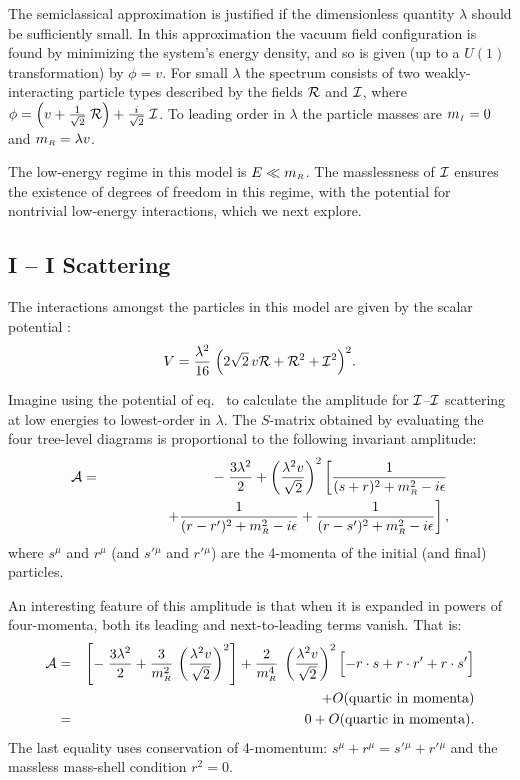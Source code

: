 The semiclassical approximation is justified if the dimensionless 
quantity $\lambda$ should be sufficiently small. In this approximation
the vacuum field configuration is found by minimizing the system's 
energy density, and so is given (up to a $U(1)$ transformation)
by $\phi = v$. 
For small $\lambda$ the spectrum consists of two weakly-interacting
particle types described by the fields ${\cal R}$ and ${\cal I}$,
where $\phi = \left( v + \frac{1}{\sqrt2} \; {\cal R} \right) + 
\frac{i}{\sqrt2} \; {\cal I}$. To leading order in $\lambda$
the particle masses are $m_{\scriptscriptstyle I} = 0$ and $m_{\scriptscriptstyle R} 
= \lambda v$. 

The low-energy regime in this model is $E \ll m_{\scriptscriptstyle R}$. The
masslessness of ${\cal I}$ ensures the existence of degrees of
freedom in this regime, with the potential for nontrivial
low-energy interactions, which we next explore. 

\subsection{{\cal I} -- {\cal I} Scattering}

The interactions amongst the particles in this model 
are given by the scalar potential :
%
\begin{equation}
\label{potl}
V = {\lambda^2 \over 16} \; \Bigl( 2 \sqrt2 \, v {\cal R} +
{\cal R}^2 + {\cal I}^2 \Bigr)^2. 
\end{equation}

Imagine using the potential of eq.~ to 
calculate the amplitude for
${\cal I}$--${\cal I}$ scattering at low energies 
to lowest-order in $\lambda$. 
The $S$-matrix obtained by evaluating the four tree-level diagrams
is proportional to the following invariant amplitude:
%
\begin{eqnarray}
\label{smatrixresult}
{\cal A} &=& - \; {3 \lambda^2 \over 2} + \left( { \lambda^2 v \over \sqrt2}
\right)^2 \left[ {1 \over (s+r)^2 + m_{\scriptscriptstyle R}^2 - i\epsilon}  \right. \nonumber\\
&& \qquad\qquad \left. + {1 \over (r-r')^2 + m_{\scriptscriptstyle R}^2 -i \epsilon} + 
{1 \over (r - s')^2 + m_{\scriptscriptstyle R}^2 - i\epsilon}\right], 
\end{eqnarray}
%
where $s^\mu$ and $r^\mu$ (and $s'{}^\mu$ and $r'{}^\mu$)
are the 4-momenta of the initial (and final) particles.

An interesting feature of this amplitude is that when it is 
expanded in powers of four-momenta, both its leading and
next-to-leading terms vanish. That is: 
%
\begin{eqnarray}
\label{zeromomlim}
{\cal A} &=&  \left[ - \; {3 \lambda^2 \over 2} + {3 \over
m_{\scriptscriptstyle R}^2} \, \left( { \lambda^2 v \over \sqrt2}
\right)^2 \right] + {2 \over m_{\scriptscriptstyle R}^4} \;
\left( { \lambda^2 v \over \sqrt2} \right)^2 \Bigl[- r \cdot s
+ r \cdot r' + r \cdot s' \Bigr]  \nonumber\\
&& \qquad\qquad\qquad\qquad \qquad\qquad\qquad
+ O(\hbox{quartic in momenta}) \nonumber\\
&=& 0 +O(\hbox{quartic in momenta}) .
\end{eqnarray}
%
The last equality uses conservation of 4-momentum: $s^\mu + r^\mu
= s'{}^\mu + r'{}^\mu$ and the massless mass-shell condition
$r^2 = 0$. 

